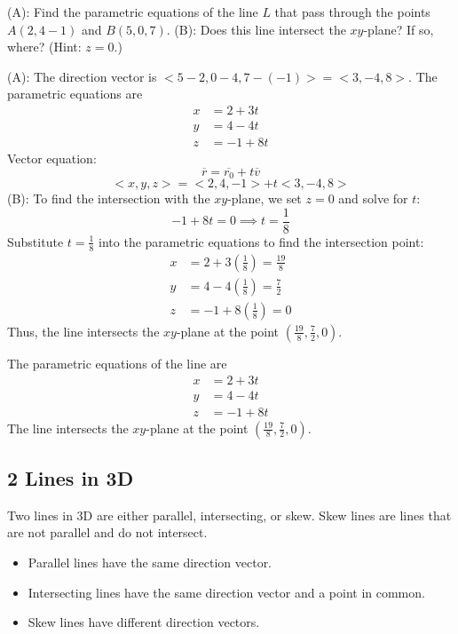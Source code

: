 \documentclass{article}
\begin{document}
\begin{examplebox}
(A): Find the parametric equations of the line \( L \) that pass through the points \( A(2, 4 -1) \) and \( B(5, 0, 7) \).
(B): Does this line intersect the \( xy \)-plane? If so, where? (Hint: \( z = 0 \).)
\begin{solutionbox}
(A): The direction vector is \( <5 - 2, 0 - 4, 7 - (-1)> = <3, -4, 8> \). The parametric equations are
\[
    \begin{aligned}
        x &= 2 + 3t \\
        y &= 4 - 4t \\
        z &= -1 + 8t
    \end{aligned}
\]
Vector equation:
\[
    \overline{r} = \overline{r_0} + t\overline{v}
\]
\[
    <x, y, z> = <2, 4, -1> + t<3, -4, 8>
\]
(B): To find the intersection with the \( xy \)-plane, we set \( z = 0 \) and solve for \( t \):
\[
    -1 + 8t = 0 \implies t = \frac{1}{8}
\]
Substitute \( t = \frac{1}{8} \) into the parametric equations to find the intersection point:
\[
    \begin{aligned}
        x &= 2 + 3\left(\frac{1}{8}\right) = \frac{19}{8} \\
        y &= 4 - 4\left(\frac{1}{8}\right) = \frac{7}{2} \\
        z &= -1 + 8\left(\frac{1}{8}\right) = 0
    \end{aligned}
\]
Thus, the line intersects the \( xy \)-plane at the point \( \left(\frac{19}{8}, \frac{7}{2}, 0\right) \).
\begin{answerbox}
The parametric equations of the line are
\[
    \begin{aligned}
        x &= 2 + 3t \\
        y &= 4 - 4t \\
        z &= -1 + 8t
    \end{aligned}
\]
The line intersects the \( xy \)-plane at the point \( \left(\frac{19}{8}, \frac{7}{2}, 0\right) \).
\end{answerbox}
\end{solutionbox}
\end{examplebox}

\subsection*{2 Lines in 3D}
\begin{remarkbox}
Two lines in 3D are either parallel, intersecting, or skew. Skew lines are lines that are not parallel and do not intersect.
\begin{itemize}
    \item Parallel lines have the same direction vector.
    \item Intersecting lines have the same direction vector and a point in common.
    \item Skew lines have different direction vectors.
\end{itemize}
\end{remarkbox}
\end{document}
